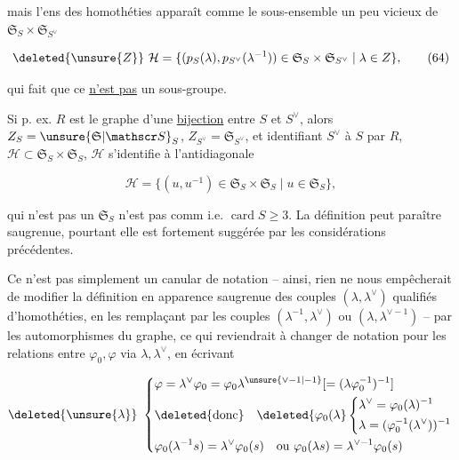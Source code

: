 mais l'ens des homothéties apparaît comme le sous-ensemble un peu vicieux de $\mathfrak S_S\times\mathfrak S_{S^\vee}$

\[
\deleted{\unsure{Z}}\ \mathcal H=\{(p_S(\lambda),p_{S^\vee}(\lambda^{-1}))\in\mathfrak S_S\times\mathfrak S_{S^\vee}\mid\lambda\in Z\}, \tag*{(64)}
\]

qui fait que ce \uline{n'est pas}  un sous-groupe.

Si p. ex. $R$ est le graphe d'une \uline{bijection} entre $S$ et $S^\vee$, alors  $Z_S=\unsure{\mathfrak S|\mathscr S}_S$, $Z_{S^\vee}=\mathfrak S_{S^\vee}$, et identifiant $S^\vee$ à $S$ par $R$,  $\mathcal H\subset\mathfrak S_S\times\mathfrak S_S$, $\mathcal H$ s'identifie à l'antidiagonale

\[
\mathcal H=\{(u,u^{-1})\in\mathfrak S_S\times\mathfrak S_S\mid u\in\mathfrak S_S\}, \tag*{(}
\]

qui n'est pas un    $\mathfrak S_S$ n'est pas comm i.e. $\operatorname{card}S\ge3$. La définition  peut paraître saugrenue, pourtant elle est fortement suggérée par les considérations précédentes.

Ce n'est pas simplement un canular de notation -- ainsi, rien ne nous empêcherait de modifier la définition en apparence saugrenue des couples $(\lambda,\lambda^\vee)$ qualifiés d'homothéties, en les remplaçant par les couples $(\lambda^{-1},\lambda^\vee)$ ou $(\lambda,\lambda^{\vee-1})$ -- par les automorphismes du graphe, ce qui reviendrait à changer de notation pour les relations entre $\varphi_0,\varphi$ via $\lambda,\lambda^\vee$, en écrivant

\[
\deleted{\unsure{\lambda}}\
\left\{\begin{aligned}
&\varphi=\lambda^\vee\varphi_0=\varphi_0\lambda^{\unsure{\vee-1|-1}}
[=(\lambda\varphi_0^{-1})^{-1}]\\
&\deleted{\text{donc}}\quad\deleted{\varphi_0(\lambda}
\left\{\begin{aligned}&\lambda^\vee=\varphi_0(\lambda)^{-1}\\&\lambda=(\varphi_0^{-1}(\lambda^\vee))^{-1}\end{aligned}\right.\\
&\varphi_0(\lambda^{-1}s)=\lambda^\vee\varphi_0(s)\quad\text{ou }\varphi_0(\lambda s)=\lambda^{\vee-1}\varphi_0(s)
\end{aligned}\right.
\]

